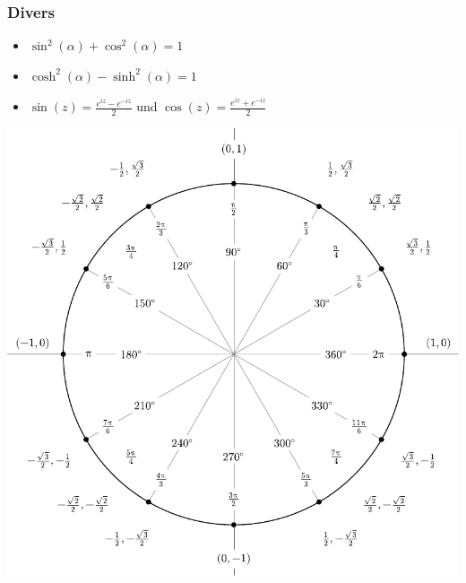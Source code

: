 \documentclass[a4paper,fontsize = 8pt]{scrartcl}
\begin{document}
\subsubsection{Divers}

\begin{itemize}
 \item $\sin^2(\alpha) + \cos^2(\alpha) = 1$
 \item $\cosh^2(\alpha) - \sinh^2(\alpha) = 1$
 \item $\sin(z) = \frac{e^{iz} - e^{-iz}}{2}$ und $\cos(z) = \frac{e^{iz} + e^{-iz}}{2}$
\end{itemize}

\begingroup
\renewcommand*{\arraystretch}{2}


\begin{center}
  \includegraphics[width=\linewidth]{include_degrees_circle.pdf}
  
\end{center}
\end{document}
